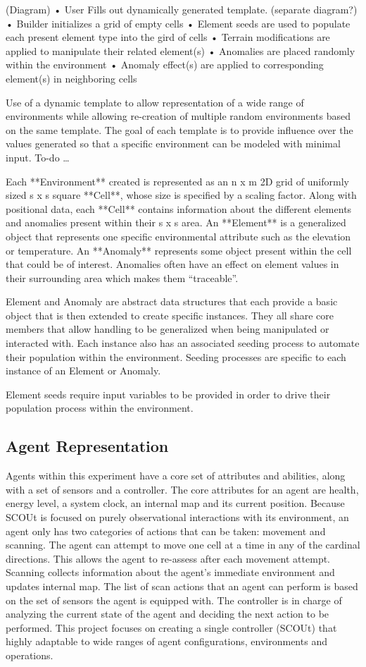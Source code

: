 \documentclass[]{report}
\begin{document}
(Diagram)
•	User Fills out dynamically generated template. (separate diagram?)
•	Builder initializes a grid of empty cells
•	Element seeds are used to populate each present element type into the gird of cells
•	Terrain modifications are applied to manipulate their related element(s)
•	Anomalies are placed randomly within the environment
•	Anomaly effect(s) are applied to corresponding element(s) in neighboring cells

Use of a dynamic template to allow representation of a wide range of environments while allowing re-creation of multiple random environments based on the same template. The goal of each template is to provide influence over the values generated so that a specific environment can be modeled with minimal input. To-do …

Each **Environment** created is represented as an n x m 2D grid of uniformly sized s x s square **Cell**, whose size is specified by a scaling factor. Along with positional data, each **Cell** contains information about the different elements and anomalies present within their s x s area. An **Element** is a generalized object that represents one specific environmental attribute such as the elevation or temperature. An **Anomaly** represents some object present within the cell that could be of interest. Anomalies often have an effect on element values in their surrounding area which makes them “traceable”.

Element and Anomaly are abstract data structures that each provide a basic object that is then extended to create specific instances. They all share core members that allow handling to be generalized when being manipulated or interacted with. Each instance also has an associated seeding process to automate their population within the environment. Seeding processes are specific to each instance of an Element or Anomaly.

Element seeds require input variables to be provided in order to drive their population process within the environment.


\subsection{Agent Representation}
Agents within this experiment have a core set of attributes and abilities, along with a set of sensors and a controller. The core attributes for an agent are health, energy level, a system clock, an internal map and its current position. Because SCOUt is focused on purely observational interactions with its environment, an agent only has two categories of actions that can be taken: movement and scanning. The agent can attempt to move one cell at a time in any of the cardinal directions. This allows the agent to re-assess after each movement attempt. Scanning collects information about the agent's immediate environment and updates internal map. The list of scan actions that an agent can perform is based on the set of sensors the agent is equipped with. The controller is in charge of analyzing the current state of the agent and deciding the next action to be performed. This project focuses on creating a single controller (SCOUt) that highly adaptable to wide ranges of agent configurations, environments and operations.
\end{document}
